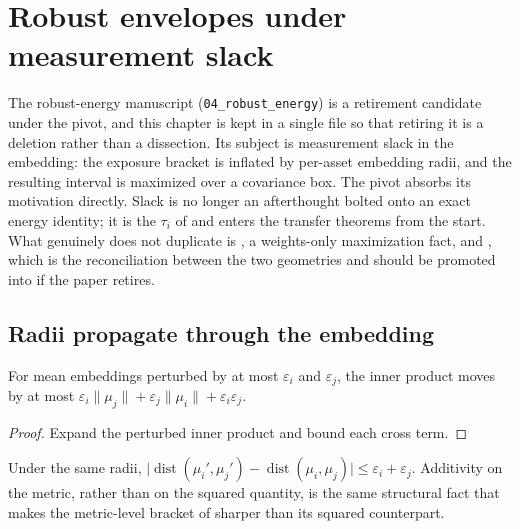 \chapter{Robust envelopes under measurement slack}
\label{chap:robust-slack}

The robust-energy manuscript (\texttt{04\_robust\_energy}) is a
retirement candidate under the pivot, and this chapter is kept in a
single file so that retiring it is a deletion rather than a dissection.
Its subject is measurement slack in the embedding: the exposure bracket is
inflated by per-asset embedding radii, and the resulting interval is maximized
over a covariance box.
The pivot absorbs its motivation directly.
Slack is no longer an afterthought bolted onto an exact energy identity; it is
the \(\tau_i\) of  and enters the transfer theorems
from the start.
What genuinely does not duplicate is , a weights-only
maximization fact, and , which is the reconciliation
between the two geometries and should be promoted into
 if the paper retires.

\section{Radii propagate through the embedding}

\begin{theorem}
  \label{thm:inner-perturbation}
  For mean embeddings perturbed by at most \(\varepsilon_i\) and
  \(\varepsilon_j\), the inner product moves by at most
  \(\varepsilon_i\lVert\mu_j\rVert+\varepsilon_j\lVert\mu_i\rVert
  +\varepsilon_i\varepsilon_j\).
\end{theorem}

\begin{proof}
  Expand the perturbed inner product and bound each cross term.
\end{proof}

\begin{theorem}
  \label{thm:dist-bracket}
  Under the same radii,
  \(\lvert\operatorname{dist}(\mu_i',\mu_j')-\operatorname{dist}(\mu_i,\mu_j)\rvert
  \le\varepsilon_i+\varepsilon_j\).
  Additivity on the metric, rather than on the squared quantity, is the same
  structural fact that makes the metric-level bracket of
   sharper than its squared counterpart.
\end{theorem}

